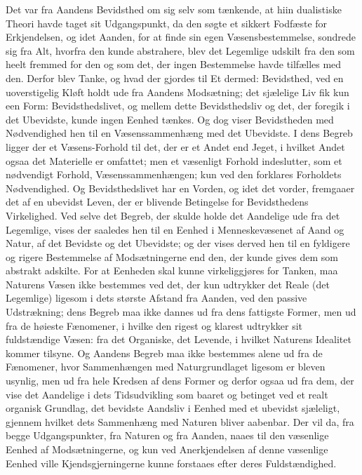 \documentclass[12pt,a4paper,openany]{book}
\newcommand{\opage}[1]{\marginnote{\footnotesize\textit{[#1]}}}
\begin{document}
Det var fra Aandens Bevidsthed om sig selv som tænkende,
at hiin dualistiske Theori havde taget sit Udgangspunkt, da
den søgte et sikkert Fodfæste for Erkjendelsen, og idet Aanden,
for at finde sin egen Væsensbestemmelse, sondrede sig fra Alt,
hvorfra den kunde abstrahere, blev det Legemlige udskilt
fra den som heelt fremmed for den og som det, der ingen
Bestemmelse havde tilfælles med den. Derfor blev Tanke,
og hvad der gjordes til Et dermed: Bevidsthed, ved en
uoverstigelig Kløft holdt ude fra Aandens Modsætning; det
sjælelige Liv fik kun een Form: Bevidsthedslivet, og mellem
dette Bevidsthedsliv og det, der foregik i det Ubevidste, kunde
ingen Eenhed tænkes. Og dog viser Bevidstheden med Nødvendighed
hen til en Væsenssammenhæng med det Ubevidste.
I dens Begreb ligger der et Væsens-Forhold til det, der er
et Andet end Jeget, i hvilket Andet ogsaa det Materielle er
omfattet; men et væsenligt Forhold indeslutter, som et nødvendigt
Forhold, Væsenssammenhængen; kun ved den forklares
Forholdets Nødvendighed. Og Bevidsthedslivet har
en Vorden, og idet det vorder, fremgaaer det af en ubevidst
\opage{45}Leven, der er blivende Betingelse for Bevidsthedens Virkelighed.
Ved selve det Begreb, der skulde holde det Aandelige
ude fra det Legemlige, vises der saaledes hen til en Eenhed
i Menneskevæsenet af Aand og Natur, af det Bevidste og
det Ubevidste; og der vises derved hen til en fyldigere og
rigere Bestemmelse af Modsætningerne end den, der kunde
gives dem som abstrakt adskilte. For at Eenheden skal kunne
virkeliggjøres for Tanken, maa Naturens Væsen ikke bestemmes
ved det, der kun udtrykker det Reale (det Legemlige) ligesom
i dets største Afstand fra Aanden, ved den passive Udstrækning;
dens Begreb maa ikke dannes ud fra dens fattigste Former,
men ud fra de høieste Fænomener, i hvilke den rigest og klarest
udtrykker sit fuldstændige Væsen: fra det Organiske, det Levende,
i hvilket Naturens Idealitet kommer tilsyne. Og Aandens
Begreb maa ikke bestemmes alene ud fra de Fænomener, hvor
Sammenhængen med Naturgrundlaget ligesom er bleven usynlig,
men ud fra hele Kredsen af dens Former og derfor
ogsaa ud fra dem, der vise det Aandelige i dets Tidsudvikling
som baaret og betinget ved et realt organisk Grundlag,
det bevidste Aandsliv i Eenhed med et ubevidst sjæleligt, gjennem
hvilket dets Sammenhæng med Naturen bliver aabenbar.
Der vil da, fra begge Udgangspunkter, fra Naturen og fra
Aanden, naaes til den væsenlige Eenhed af Modsætningerne,
og kun ved Anerkjendelsen af denne væsenlige Eenhed ville
Kjendsgjerningerne kunne forstaaes efter deres Fuldstændighed.
\end{document}

